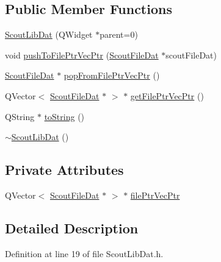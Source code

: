 \subsection*{Public Member Functions}
\begin{DoxyCompactItemize}
\item 
\hyperlink{class_scout_lib_dat_ad6f810930a3b2bdf00a66f7ac8e3ab03}{Scout\-Lib\-Dat} (Q\-Widget $\ast$parent=0)
\item 
void \hyperlink{class_scout_lib_dat_ae5c3f32dd10e948ec9edb7b0fa11b0eb}{push\-To\-File\-Ptr\-Vec\-Ptr} (\hyperlink{class_scout_file_dat}{Scout\-File\-Dat} $\ast$scout\-File\-Dat)
\item 
\hyperlink{class_scout_file_dat}{Scout\-File\-Dat} $\ast$ \hyperlink{class_scout_lib_dat_a11f3537bd6f2d32b4d8f88f0a47ccb1c}{pop\-From\-File\-Ptr\-Vec\-Ptr} ()
\item 
Q\-Vector$<$ \hyperlink{class_scout_file_dat}{Scout\-File\-Dat} $\ast$ $>$ $\ast$ \hyperlink{class_scout_lib_dat_ab66057edcb3bac72646d8f458b3b3cda}{get\-File\-Ptr\-Vec\-Ptr} ()
\item 
Q\-String $\ast$ \hyperlink{class_scout_lib_dat_a01326b95eb9b2807d96530603e1a32c2}{to\-String} ()
\item 
\hyperlink{class_scout_lib_dat_a30e8daf8d8f66cd4ff2c3360dc214e4c}{$\sim$\-Scout\-Lib\-Dat} ()
\end{DoxyCompactItemize}
\subsection*{Private Attributes}
\begin{DoxyCompactItemize}
\item 
Q\-Vector$<$ \hyperlink{class_scout_file_dat}{Scout\-File\-Dat} $\ast$ $>$ $\ast$ \hyperlink{class_scout_lib_dat_ae53718a0ccc56bcdd8ae310d64acbc75}{file\-Ptr\-Vec\-Ptr}
\end{DoxyCompactItemize}


\subsection{Detailed Description}


Definition at line 19 of file Scout\-Lib\-Dat.\-h.



